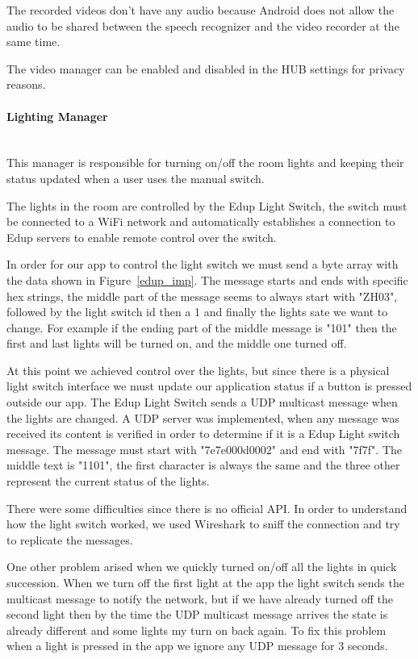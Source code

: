 The recorded videos don't have any audio because Android does not allow the audio to be shared between the speech recognizer and the video recorder at the same time.

The video manager can be enabled and disabled in the HUB settings for privacy reasons.



\paragraph{Lighting Manager}\mbox{}\\

This manager is responsible for turning on/off the room lights and keeping their status updated when a user uses the manual switch.


The lights in the room are controlled by the Edup Light Switch, the switch must be connected to a WiFi network and automatically establishes a connection to Edup servers to enable remote control over the switch.

In order for our app to control the light switch we must send a byte array with the data shown in Figure~\ref{edup_imp}.
The message starts and ends with specific hex strings, the middle part of the message seems to always start with "ZH03", followed by the light switch id then a 1 and finally the lights sate we want to change. For example if the ending part of the middle message is "101" then the first and last lights will be turned on, and the middle one turned off.

At this point we achieved control over the lights, but since there is a physical light switch interface we must update our application status if a button is pressed outside our app.
The Edup Light Switch sends a \ac{UDP} multicast message when the lights are changed. A \ac{UDP} server was implemented, when any message was received its content is verified in order to determine if it is a Edup Light switch message. The message must start with "7e7e000d0002" and end with "7f7f". The middle text is "1101", the first character is always the same and the three other represent the current status of the lights.

There were some difficulties since there is no official API. In order to understand how the light switch worked, we used Wireshark to sniff the connection and try to replicate the messages.

One other problem arised when we quickly turned on/off all the lights in quick succession. When we turn off the first light at the app the light switch sends the multicast message to notify the network, but if we have already turned off the second light then by the time the \ac{UDP} multicast message arrives the state is already different and some lights my turn on back again. To fix this problem when a light is pressed in the app we ignore any \ac{UDP} message for 3 seconds.



